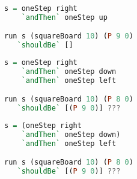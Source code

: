 \documentclass[10pt]{beamer}
\begin{document}
\begin{frame}[fragile]
\begin{lstlisting}[language=haskell, basicstyle=\ttfamily]
s = oneStep right
    `andThen` oneStep up

run s (squareBoard 10) (P 9 0)
   `shouldBe` []
\end{lstlisting}
\end{frame}
\begin{frame}[fragile]
\begin{lstlisting}[language=haskell, basicstyle=\ttfamily]
s = oneStep right
    `andThen` oneStep down
    `andThen` oneStep left

run s (squareBoard 10) (P 8 0)
   `shouldBe` [(P 9 0)] ???
\end{lstlisting}
\end{frame}

\begin{frame}[fragile]
\begin{lstlisting}[language=haskell, basicstyle=\ttfamily]
s = (oneStep right
    `andThen` oneStep down)
    `andThen` oneStep left

run s (squareBoard 10) (P 8 0)
   `shouldBe` [(P 9 0)] ???
\end{lstlisting}
\end{frame}
\end{document}
